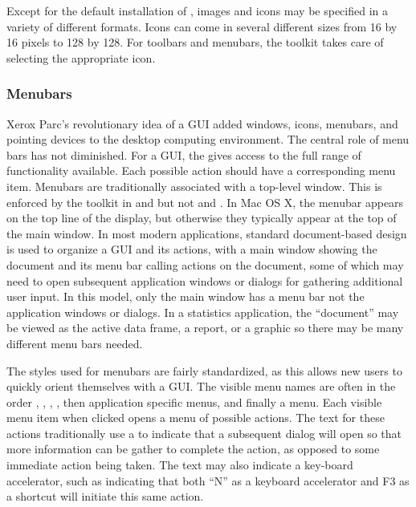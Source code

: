 Except for the default installation of , images and icons
may be specified in a variety of different formats.  Icons can come in
several different sizes from 16 by 16 pixels to 128 by 128. For
toolbars and menubars, the toolkit takes care of selecting the
appropriate icon.


\subsubsection{Menubars}
\label{sec:GUI:menubars}

Xerox Parc's revolutionary idea of a  GUI added windows,
icons, menubars, and pointing devices to the desktop computing
environment. The central role of menu bars has not diminished. For a
GUI, the  gives access to the full range of functionality
available. Each possible action should have a corresponding menu
item. Menubars are traditionally associated with a top-level
window. This is enforced by the toolkit in \wxWidgets\/ and
\Java\/ but not \tcltk\/ and \GTK.  In Mac OS X, the
menubar appears on the top line of the display, but otherwise they
typically appear at the top of the main window. In most modern
applications, standard document-based design is used to
organize a GUI and its actions, with a main window showing the
document and its menu bar calling actions on the document, some of
which may need to open subsequent application windows or dialogs for
gathering additional user input.  In this model, only the main window
has a menu bar not the application windows or dialogs. In a statistics
application, the ``document'' may be viewed as the active data frame,
a report, or a graphic so there may be many different menu bars
needed.

The styles used for menubars are fairly standardized, as this allows
new users to quickly orient themselves with a GUI. The visible menu
names are often in the order , , ,
, then application specific menus, and finally a 
menu. Each visible menu item when clicked opens a menu of possible
actions. The text for these actions traditionally use a   to
indicate that a subsequent dialog will open so that more information
can be gather to complete the action, as opposed to some immediate
action being taken. The text may also indicate a key-board
accelerator, such as  indicating that
both ``N'' as a keyboard accelerator and F3 as a shortcut will
initiate this same action. 


